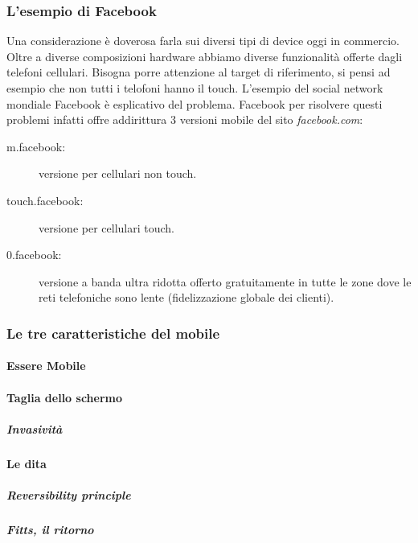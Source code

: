 		\subsubsection{L'esempio di Facebook}
			Una considerazione è doverosa farla sui diversi tipi di device oggi in commercio. Oltre a diverse composizioni hardware abbiamo diverse funzionalità offerte dagli telefoni cellulari. Bisogna porre attenzione al target di riferimento, si pensi ad esempio che non tutti i telofoni hanno il touch.
			L'esempio del social network mondiale Facebook è esplicativo del problema. Facebook per risolvere questi problemi infatti offre addirittura 3 versioni mobile del sito \emph{facebook.com}:
			\begin{description}
				\item [m.facebook:] versione per cellulari non touch.
				\item [touch.facebook:] versione per cellulari touch.
				\item [0.facebook:] versione a banda ultra ridotta offerto gratuitamente in tutte le zone dove le reti telefoniche sono lente (fidelizzazione globale dei clienti).		
			\end{description}
		
		\subsubsection{Le tre caratteristiche del mobile}
			
			\paragraph{Essere Mobile}
			\paragraph{Taglia dello schermo}
				\subparagraph{Invasività}
			\paragraph{Le dita}
				\subparagraph{Reversibility principle}
				\subparagraph{Fitts, il ritorno}